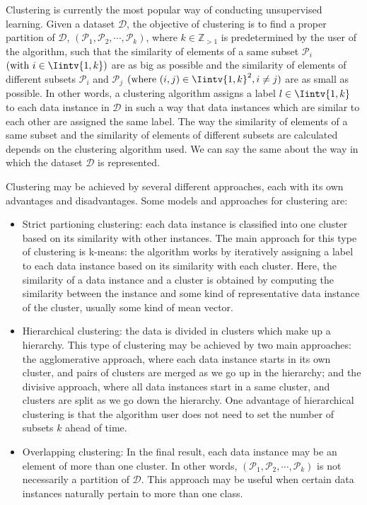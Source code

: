 Clustering is currently the most popular way of conducting unsupervised learning. 
Given a dataset $\mathcal D$, the objective of clustering is to find a proper partition of $\mathcal D$, $(\mathcal P_1, \mathcal P_2, \cdots, \mathcal P_k)$, where $k \in \mathbb Z_{>1}$ is predetermined by the user of the algorithm, such that the similarity of elements of a same subset $\mathcal P_i$  $(\text{with } i \in \Iintv{1,k})$ are as big as possible and the similarity of elements of different subsets $\mathcal P_i$ and $\mathcal P_j$ $(\text{where } (i,j) \in \Iintv{1,k}^2, i \ne j)$ are as small as possible. 
In other words, a clustering algorithm assigns a label $l \in \Iintv{1,k}$ to each data instance in $\mathcal D$ in such a way that data instances which are similar to each other are assigned the same label.
The way the similarity of elements of a same subset and the similarity of elements of different subsets are calculated depends on the clustering algorithm used. 
We can say the same about the way in which the dataset $\mathcal D$ is represented.

Clustering may be achieved by several different approaches, each with its own advantages and disadvantages.
Some models and approaches for clustering are:
\begin{itemize}
   \item Strict partioning clustering: each data instance is classified into one cluster based on its similarity with other instances.
      The main approach for this type of clustering is k-means: the algorithm works by iteratively assigning a label to each data instance based on its similarity with each cluster.
      Here, the similarity of a data instance and a cluster is obtained by computing the similarity between the instance and some kind of representative data instance of the cluster, usually some kind of mean vector.
   \item Hierarchical clustering: the data is divided in clusters which make up a hierarchy.
      This type of clustering may be achieved by two main approaches: the agglomerative approach, where each data instance starts in its own cluster, and pairs of clusters are merged as we go up in the hierarchy; and the divisive approach, where all data instances start in a same cluster, and clusters are split as we go down the hierarchy.
      One advantage of hierarchical clustering is that the algorithm user does not need to set the number of subsets $k$ ahead of time.
   \item Overlapping clustering: In the final result, each data instance may be an element of more than one cluster.
      In other words, $(\mathcal P_1, \mathcal P_2, \cdots, \mathcal P_k)$ is not necessarily a partition of $\mathcal D$.
      This approach may be useful when certain data instances naturally pertain to more than one class.
\end{itemize}

